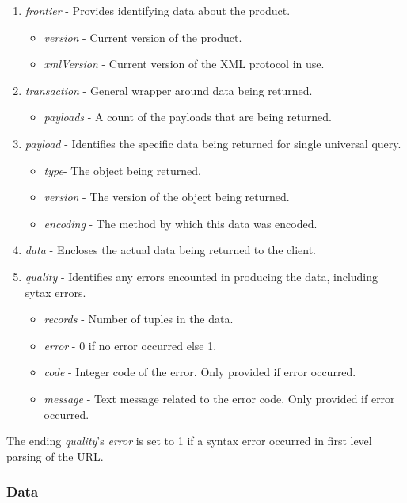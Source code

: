 \begin{enumerate}
\item \emph{frontier} - Provides identifying data about the product.
\begin{itemize}
\item \emph{version} - Current version of the product.
\item \emph{xmlVersion} - Current version of the XML protocol in use.
\end{itemize}
\item \emph{transaction} - General wrapper around data being returned.
\begin{itemize}
\item \emph{payloads} - A count of the payloads that are being returned.
\end {itemize} 
\item \emph{payload} - Identifies the specific data being returned for single
universal query.
\begin{itemize}
\item \emph{type}- The object being returned.
\item \emph{version} - The version of the object being returned.
\item \emph{encoding} - The method by which this data was encoded.
\end {itemize}
\item \emph{data} - Encloses the actual data being returned to the client.
\item \emph{quality} - Identifies any errors encounted in producing the data, including sytax errors.
\begin{itemize}
\item \emph{records} - Number of tuples in the data.
\item \emph{error} - 0 if no error occurred else 1. 
\item \emph{code} - Integer code of the error. Only provided if error occurred.
\item \emph{message} - Text message related to the error code. Only provided if error occurred.
\end {itemize}
\end{enumerate}

The ending \emph{quality}'s \emph{error} is set to 1 if a syntax error occurred in first level parsing of the URL.  

\subsubsection{Data}


